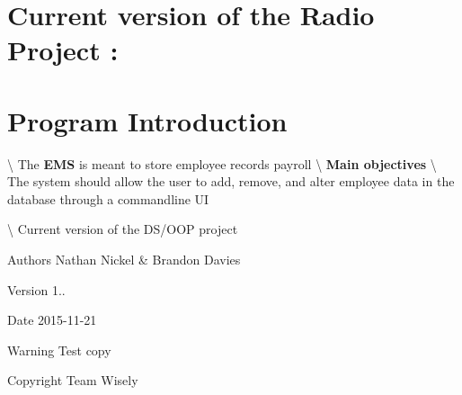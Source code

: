 \hypertarget{index_version}{}\section{Current version of the Radio Project \+:}\label{index_version}
\hypertarget{index_intro}{}\section{Program Introduction}\label{index_intro}
\textbackslash{} The {\bfseries E\+M\+S} is meant to store employee records payroll \textbackslash{} {\bfseries Main objectives} \textbackslash{} The system should allow the user to add, remove, and alter employee data in the database through a commandline U\+I



 \textbackslash{} Current version of the D\+S/\+O\+O\+P project 
\begin{DoxyItemize}
\item \begin{DoxyAuthor}{Authors}
Nathan Nickel \& Brandon Davies 
\end{DoxyAuthor}

\item \begin{DoxyVersion}{Version}
1.. 
\end{DoxyVersion}

\item \begin{DoxyDate}{Date}
2015-\/11-\/21 
\end{DoxyDate}

\item \begin{DoxyWarning}{Warning}
Test copy 
\end{DoxyWarning}

\item \begin{DoxyCopyright}{Copyright}
Team Wisely 
\end{DoxyCopyright}

\end{DoxyItemize}